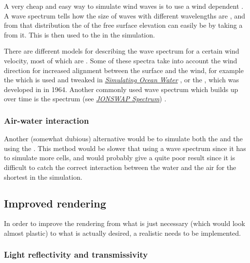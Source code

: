 A very cheap and easy way to simulate wind waves is to use a wind dependent . A wave spectrum tells how the size of waves with different wavelengths are \distributed, and from that distribution the  of the free surface elevation can easily be \generated by taking a \random \sample from it. This is then used to \initialize the  in the simulation.

There are different models for describing the wave spectrum for a certain wind velocity, most of which are \empirical. Some of these spectra take into account the wind direction for increased alignment between the surface and the wind, for example the  which is used and tweaked in \textit{\href{http://graphics.ucsd.edu/courses/rendering/2005/jdewall/tessendorf.pdf}{Simulating Ocean Water}} \citep{temp}, or the , which was developed in  \citep{temp} in 1964. Another commonly used wave spectrum which builds up over time is the \JONSWAP spectrum (see \textit{\href{http://www.wikiwaves.org/Ocean-Wave\_Spectra\#JONSWAP\_Spectrum}{JONSWAP Spectrum}}) \citep{temp}.

\subsubsection{Air-water interaction}

Another (somewhat dubious) alternative would be to simulate both the \water and the \air using the \FVM. This method would be slower that using a wave spectrum since it has to simulate more cells, and would probably give a quite poor result since it is difficult to catch the correct interaction between the water and the air for the shortest \wavelengths in the simulation.

\subsection{Improved rendering}

In order to improve the rendering from what is just necessary (which would look almost plastic) to what is actually desired, a realistic  needs to be implemented.

\subsubsection{Light reflectivity and transmissivity}


